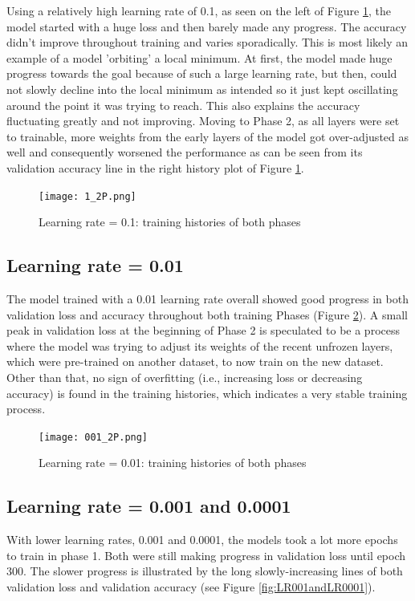 \documentclass[]{article}
\begin{document}
Using a relatively high learning rate of 0.1, as seen on the left of Figure \ref{LR1}, the model started with a huge loss and then barely made any progress. The accuracy didn't improve throughout training and varies sporadically. This is most likely an example of a model 'orbiting' a local minimum. At first, the model made huge progress towards the goal because of such a large learning rate, but then, could not slowly decline into the local minimum as intended so it just kept oscillating around the point it was trying to reach. This also explains the accuracy fluctuating greatly and not improving. Moving to Phase 2, as all layers were set to trainable, more weights from the early layers of the model got over-adjusted as well and consequently worsened the performance as can be seen from its validation accuracy line in the right history plot of Figure \ref{LR1}. 

\begin{figure}[H]
  \texttt{[image: 1\_2P.png]}
  \centering
  \caption{Learning rate = 0.1: training histories of both phases}
  \label{LR1}
\end{figure}

\subsection{Learning rate = 0.01} \label{LR001section}

The model trained with a 0.01 learning rate overall showed good progress in both validation loss and accuracy throughout both training Phases (Figure \ref{LR001}). A small peak in validation loss at the beginning of Phase 2 is speculated to be a process where the model was trying to adjust its weights of the recent unfrozen layers, which were pre-trained on another dataset, to now train on the new dataset. Other than that, no sign of overfitting (i.e., increasing loss or decreasing accuracy) is found in the training histories, which indicates a very stable training process. 

\begin{figure}[H]
  \texttt{[image: 001\_2P.png]}
  \centering
  \caption{Learning rate = 0.01: training histories of both phases}
  \label{LR001}
\end{figure}

\subsection{Learning rate = 0.001 and 0.0001}

With lower learning rates, 0.001 and 0.0001, the models took a lot more epochs to train in phase 1. Both were still making progress in validation loss until epoch 300. The slower progress is illustrated by the long slowly-increasing lines of both validation loss and validation accuracy (see Figure \ref{fig:LR001andLR0001}). 
\end{document}
